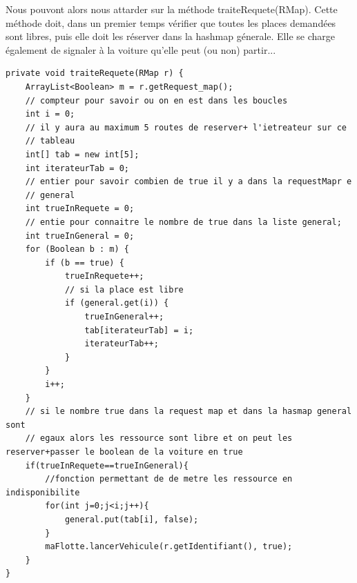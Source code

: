 \documentclass[a4paper, titlepage]{report}
\begin{document}
Nous pouvont alors nous attarder sur la méthode traiteRequete(RMap). Cette méthode doit, dans un premier temps vérifier que toutes les places demandées sont libres, puis elle doit les réserver dans la hashmap génerale. Elle se charge également de signaler à la voiture qu'elle peut (ou non) partir...
\begin{lstlisting}
private void traiteRequete(RMap r) {
	ArrayList<Boolean> m = r.getRequest_map();
	// compteur pour savoir ou on en est dans les boucles
	int i = 0;
	// il y aura au maximum 5 routes de reserver+ l'ietreateur sur ce
	// tableau
	int[] tab = new int[5];
	int iterateurTab = 0;
	// entier pour savoir combien de true il y a dans la requestMapr e
	// general
	int trueInRequete = 0;
	// entie pour connaitre le nombre de true dans la liste general;
	int trueInGeneral = 0;
	for (Boolean b : m) {
		if (b == true) {
			trueInRequete++;
			// si la place est libre
			if (general.get(i)) {
				trueInGeneral++;
				tab[iterateurTab] = i;
				iterateurTab++;
			}
		}
		i++;
	}
	// si le nombre true dans la request map et dans la hasmap general sont
	// egaux alors les ressource sont libre et on peut les reserver+passer le boolean de la voiture en true
	if(trueInRequete==trueInGeneral){
		//fonction permettant de de metre les ressource en indisponibilite
		for(int j=0;j<i;j++){
			general.put(tab[i], false);
		}
		maFlotte.lancerVehicule(r.getIdentifiant(), true);	
	}
}
\end{lstlisting}
\end{document}
